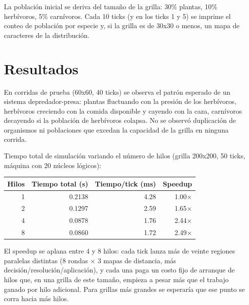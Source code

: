 \documentclass[11pt]{article}
\begin{document}
La población inicial se deriva del tamaño de la grilla: 30\% plantas,
10\% herbívoros, 5\% carnívoros. Cada 10 ticks (y en los ticks 1 y 5) se
imprime el conteo de población por especie y, si la grilla es de 30x30 o
menos, un mapa de caracteres de la distribución.

\section{Resultados}

En corridas de prueba (60x60, 40 ticks) se observa el patrón esperado de
un sistema depredador-presa: plantas fluctuando con la presión de los
herbívoros, herbívoros creciendo con la comida disponible y cayendo con
la caza, carnívoros decayendo si la población de herbívoros colapsa. No
se observó duplicación de organismos ni poblaciones que excedan la
capacidad de la grilla en ninguna corrida.

Tiempo total de simulación variando el número de hilos (grilla 200x200,
50 ticks, máquina con 20 núcleos lógicos):

\begin{center}
\begin{tabular}{@{}rrrr@{}}
\toprule
Hilos & Tiempo total (s) & Tiempo/tick (ms) & Speedup \\
\midrule
1 & 0.2138 & 4.28 & 1.00$\times$ \\
2 & 0.1297 & 2.59 & 1.65$\times$ \\
4 & 0.0878 & 1.76 & 2.44$\times$ \\
8 & 0.0860 & 1.72 & 2.49$\times$ \\
\bottomrule
\end{tabular}
\end{center}

El speedup se aplana entre 4 y 8 hilos: cada tick lanza más de veinte
regiones paralelas distintas (8 rondas $\times$ 3 mapas de distancia, más
decisión/resolución/aplicación), y cada una paga un costo fijo de
arranque de hilos que, en una grilla de este tamaño, empieza a pesar más
que el trabajo ganado por hilo adicional. Para grillas más grandes se
esperaría que ese punto se corra hacia más hilos.
\end{document}

